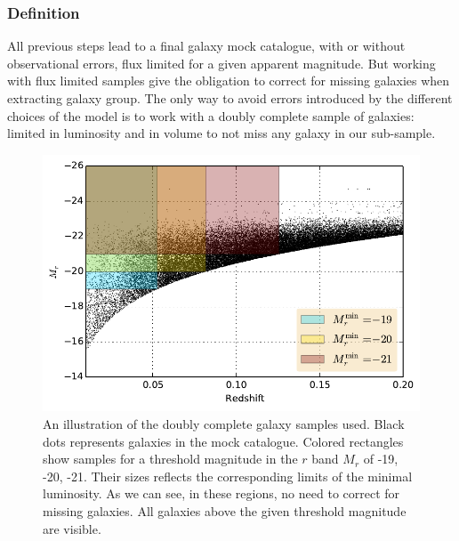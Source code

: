 \subsubsection{Definition}
\label{ssub:galaxy_sample_definition}

All previous steps lead to a final galaxy mock catalogue, with or without
observational errors, flux limited for a given apparent magnitude. But working
with flux limited samples give the obligation to correct for missing galaxies
when extracting galaxy group. The only way to avoid errors introduced by the
different choices of the model is to work with a doubly complete sample of
galaxies: limited in luminosity and in volume to not miss any galaxy in our
sub-sample.
%
\begin{figure}[htb]
    \centering
    \includegraphics[width=0.8\linewidth]{figures/mock/subsamples.pdf}
    \caption{An illustration of the doubly complete galaxy samples used. Black
        dots represents galaxies in the mock catalogue. Colored rectangles show
        samples for a threshold magnitude in the $r$ band $M_r$ of -19, -20,
        -21. Their sizes reflects the corresponding limits of the minimal
    luminosity. As we can see, in these regions, no need to correct for missing
galaxies. All galaxies above the given threshold magnitude are visible.
\label{fig:subsamples}}
\end{figure}

